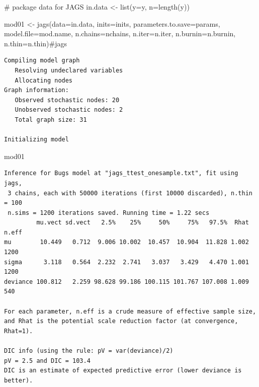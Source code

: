\documentclass[
  13,
  letterpaper,
]{report}
\newenvironment{Shaded}{\begin{snugshade}}{\end{snugshade}}
\newcommand{\AttributeTok}[1]{\textcolor[rgb]{0.40,0.45,0.13}{#1}}
\newcommand{\CommentTok}[1]{\textcolor[rgb]{0.37,0.37,0.37}{#1}}
\newcommand{\FunctionTok}[1]{\textcolor[rgb]{0.28,0.35,0.67}{#1}}
\newcommand{\NormalTok}[1]{\textcolor[rgb]{0.00,0.23,0.31}{#1}}
\newcommand{\OtherTok}[1]{\textcolor[rgb]{0.00,0.23,0.31}{#1}}
\begin{document}
\begin{Shaded}
\begin{Highlighting}[]
\CommentTok{\# package data for JAGS}
\NormalTok{in.data }\OtherTok{\textless{}{-}} \FunctionTok{list}\NormalTok{(}\AttributeTok{y=}\NormalTok{y, }\AttributeTok{n=}\FunctionTok{length}\NormalTok{(y))}

\NormalTok{mod01 }\OtherTok{\textless{}{-}} \FunctionTok{jags}\NormalTok{(}\AttributeTok{data=}\NormalTok{in.data, }\AttributeTok{inits=}\NormalTok{inits,}
              \AttributeTok{parameters.to.save=}\NormalTok{params,}
              \AttributeTok{model.file=}\NormalTok{mod.name,}
              \AttributeTok{n.chains=}\NormalTok{nchains, }\AttributeTok{n.iter=}\NormalTok{n.iter,}
              \AttributeTok{n.burnin=}\NormalTok{n.burnin, }\AttributeTok{n.thin=}\NormalTok{n.thin)}\CommentTok{\#jags}
\end{Highlighting}
\end{Shaded}

\begin{verbatim}
Compiling model graph
   Resolving undeclared variables
   Allocating nodes
Graph information:
   Observed stochastic nodes: 20
   Unobserved stochastic nodes: 2
   Total graph size: 31

Initializing model
\end{verbatim}

\begin{Shaded}
\begin{Highlighting}[]
\NormalTok{mod01}
\end{Highlighting}
\end{Shaded}

\begin{verbatim}
Inference for Bugs model at "jags_ttest_onesample.txt", fit using jags,
 3 chains, each with 50000 iterations (first 10000 discarded), n.thin = 100
 n.sims = 1200 iterations saved. Running time = 1.22 secs
         mu.vect sd.vect   2.5%    25%     50%     75%   97.5%  Rhat n.eff
mu        10.449   0.712  9.006 10.002  10.457  10.904  11.828 1.002  1200
sigma      3.118   0.564  2.232  2.741   3.037   3.429   4.470 1.001  1200
deviance 100.812   2.259 98.628 99.186 100.115 101.767 107.008 1.009   540

For each parameter, n.eff is a crude measure of effective sample size,
and Rhat is the potential scale reduction factor (at convergence, Rhat=1).

DIC info (using the rule: pV = var(deviance)/2)
pV = 2.5 and DIC = 103.4
DIC is an estimate of expected predictive error (lower deviance is better).
\end{verbatim}
\end{document}

